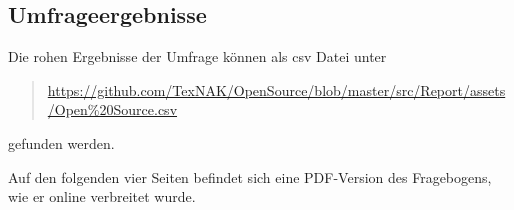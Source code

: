 \documentclass[a4paper]{article}
\begin{document}
        \subsection{Umfrageergebnisse}
            Die rohen Ergebnisse der Umfrage können als csv Datei unter
            \begin{quote}
                \scriptsize \url{https://github.com/TexNAK/OpenSource/blob/master/src/Report/assets/Open\%20Source.csv}
            \end{quote}
            gefunden werden.
            
            Auf den folgenden vier Seiten befindet sich eine PDF-Version des Fragebogens, wie er online verbreitet wurde.
\end{document}
